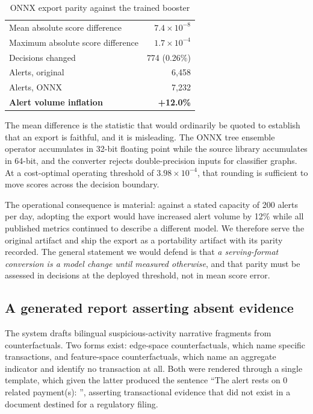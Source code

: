 \documentclass[conference]{IEEEtran}
\begin{document}
\begin{table}[t]
\caption{ONNX export parity against the trained booster}
\label{tab:onnx}
\centering
\small
\begin{tabular}{lr}
\toprule
Mean absolute score difference & $7.4\times10^{-8}$ \\
Maximum absolute score difference & $1.7\times10^{-4}$ \\
Decisions changed & 774 (0.26\%) \\
Alerts, original & 6{,}458 \\
Alerts, ONNX & 7{,}232 \\
\textbf{Alert volume inflation} & \textbf{+12.0\%} \\
\bottomrule
\end{tabular}
\end{table}

The mean difference is the statistic that would ordinarily be quoted to
establish that an export is faithful, and it is misleading. The ONNX tree
ensemble operator accumulates in 32-bit floating point while the source library
accumulates in 64-bit, and the converter rejects double-precision inputs for
classifier graphs. At a cost-optimal operating threshold of $3.98\times10^{-4}$,
that rounding is sufficient to move scores across the decision boundary.

The operational consequence is material: against a stated capacity of 200 alerts
per day, adopting the export would have increased alert volume by 12\% while all
published metrics continued to describe a different model. We therefore serve the
original artifact and ship the export as a portability artifact with its parity
recorded. The general statement we would defend is that \emph{a serving-format
conversion is a model change until measured otherwise}, and that parity must be
assessed in decisions at the deployed threshold, not in mean score error.

\subsection{A generated report asserting absent evidence}

The system drafts bilingual suspicious-activity narrative fragments from
counterfactuals. Two forms exist: edge-space counterfactuals, which name
specific transactions, and feature-space counterfactuals, which name an
aggregate indicator and identify no transaction at all. Both were rendered
through a single template, which given the latter produced the sentence
``The alert rests on 0 related payment(s): '', asserting transactional evidence
that did not exist in a document destined for a regulatory filing.
\end{document}
